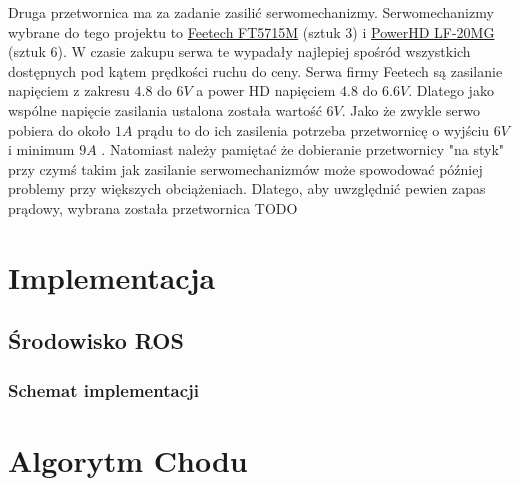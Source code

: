 \documentclass[a4paper,13pt]{article}
\begin{document}
Druga przetwornica ma za zadanie zasilić serwomechanizmy. Serwomechanizmy wybrane do tego projektu to \href{https://botland.com.pl/serwa-typu-standard/9182-serwo-feetech-ft5715m-standard-5904422312756.html}{Feetech FT5715M} (sztuk 3) i \href{https://botland.com.pl/serwa-typu-standard/3576-serwo-powerhd-lf-20mg-standard-6939670200387.html}{PowerHD LF-20MG} (sztuk 6). W czasie zakupu serwa te wypadały najlepiej spośród wszystkich dostępnych pod kątem prędkości ruchu do ceny. Serwa firmy Feetech są zasilanie napięciem z zakresu $4.8$ do $6V$ a power HD napięciem $4.8$ do $6.6V$. Dlatego jako wspólne napięcie zasilania ustalona została wartość $6V$. Jako że zwykle serwo pobiera do około $1A$ prądu to do ich zasilenia potrzeba przetwornicę o wyjściu $6V$ i minimum $9A$ \cite{Servo_power_sup}. Natomiast należy pamiętać że dobieranie przetwornicy "na styk" przy czymś takim jak zasilanie serwomechanizmów może spowodować później problemy przy większych obciążeniach. Dlatego, aby uwzględnić pewien zapas prądowy, wybrana została przetwornica TODO


\section{Implementacja}
\subsection{Środowisko ROS}
\subsubsection{Schemat implementacji}

\section{Algorytm Chodu}
\end{document}
